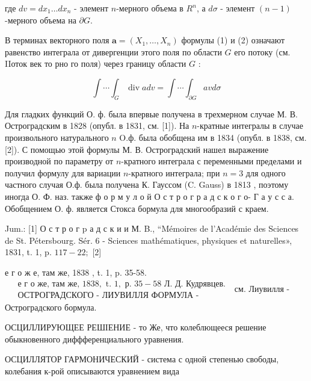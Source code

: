 \documentclass[10pt]{article}
\begin{document}
где $d v=d x_{1} \ldots d x_{n}$ - элемент $n$-мерного объема в $R^{n}$, а $d \sigma$ - элемент $(n-1)$-мерного объема на $\partial G$.



В терминах векторного поля $\boldsymbol{a}=\left(X_{1}, \ldots, X_{n}\right)$ формулы (1) и (2) означают равенство интеграла от дивергенции этого поля по области $G$ его потоку (см. IIоток век то рно го поля) через границу области $G$ :



\[

\int \cdots \int_{G} \operatorname{div} a d v=\int \cdots \int_{\partial G} a v d \sigma

\]



Для гладких функций О. ф. была впервые получена в трехмерном случае М. В. Остроградским в 1828 (опубл. в 1831, см. [1]). На $n$-кратные интегралы в случае произвольного натурального $n$ O.ф. была обобщена им в 1834 (опубл. в 1838, см. [2]). С помощью этой формулы М. В. Остроградский нашел выражение производной по параметру от $n$-кратного интеграла с переменными пределами и получил формулу для вариации $n$-кратного интеграла; при $n=3$ для одного частного случая О.ф. была получена К. Гауссом (C. Gauss) в 1813 , поэтому иногда О. Ф. наз. также ф о р м у л о й О с т р о г р а д с к о г о- Г а у с с а. Обобщением О. ф. является Стокса бормула для многообразий с краем.



Jum.: [1] О с т р о г p а д с к и и М. B., “Mémoires de l'Académie des Sciences de St. Pétersbourg. Sér. 6 - Sciences mathématiques, physiques et naturelles», 1831, t. 1, p. $117-22 ;$ [2]

е г о ж е, там же, 1838 , t. 1, p. 35-58. $\begin{aligned} & \text { е г о же, там же, } 1838, \text { t. } 1, \text { р. } 35-58 \text { Л. Д. Кудрявцев. } \\ & \text { ОСТРОГРАДСКОГО - ЛИУВИЛЛЯ ФОРМУЛА - }\end{aligned}$ см. Лиувилля - Остроградского бормула.



ОСЦИЛЛИРУЮЩЕЕ РЕШІЕНИЕ - то Же, что колеблющееся решение обыкновенного диффференциального уравнения.



ОСЦИЛЛЯТОР ГАРМОНИЧЕСКИЙ - система с одной степенью свободы, колебания к-рой описываются уравнением вида
\end{document}
